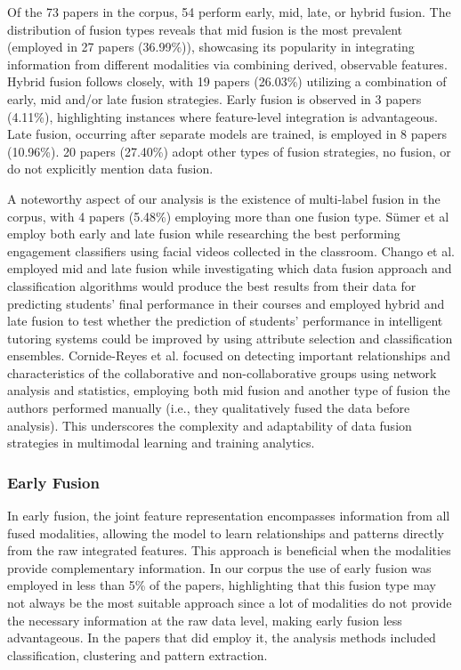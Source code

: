 \documentclass[manuscript,screen,review]{acmart}
\begin{document}
Of the 73 papers in the corpus, 54 perform early, mid, late, or hybrid fusion. The distribution of fusion types reveals that mid fusion is the most prevalent (employed in 27 papers (36.99\%)), showcasing its popularity in integrating information from different modalities via combining derived, observable features. Hybrid fusion follows closely, with 19 papers (26.03\%) utilizing a combination of early, mid and/or late fusion strategies. Early fusion is observed in 3 papers (4.11\%), highlighting instances where feature-level integration is advantageous. Late fusion, occurring after separate models are trained, is employed in 8 papers (10.96\%). 20 papers (27.40\%) adopt other types of fusion strategies, no fusion, or do not explicitly mention data fusion.

A noteworthy aspect of our analysis is the existence of multi-label fusion in the corpus, with 4 papers (5.48\%) employing more than one fusion type. Sümer et al \cite{1315379489} employ both early and late fusion while researching the best performing engagement classifiers using facial videos collected in the classroom. Chango et al. employed mid and late fusion\cite{2936220551} while investigating which data fusion approach and classification algorithms would produce the best results from their data for predicting students’ final performance in their courses and employed hybrid and late fusion\cite{4277812050} to test whether the prediction of students' performance in intelligent tutoring systems could be improved by using attribute selection and classification ensembles. Cornide-Reyes et al. \cite{4019205162} focused on detecting important relationships and characteristics of the collaborative and non-collaborative groups using network analysis and statistics, employing both mid fusion and another type of fusion the authors performed manually (i.e., they qualitatively fused the data before analysis). This underscores the complexity and adaptability of data fusion strategies in multimodal learning and training analytics. 

\subsubsection{Early Fusion}

In early fusion, the joint feature representation encompasses information from all fused modalities, allowing the model to learn relationships and patterns directly from the raw integrated features. This approach is beneficial when the modalities provide complementary information. In our corpus the use of early fusion was employed in less than 5\% of the papers, highlighting that this fusion type may not always be the most suitable approach since a lot of modalities do not provide the necessary information at the raw data level, making early fusion less advantageous. In the papers that did employ it, the analysis methods included classification, clustering and pattern extraction.
\end{document}
